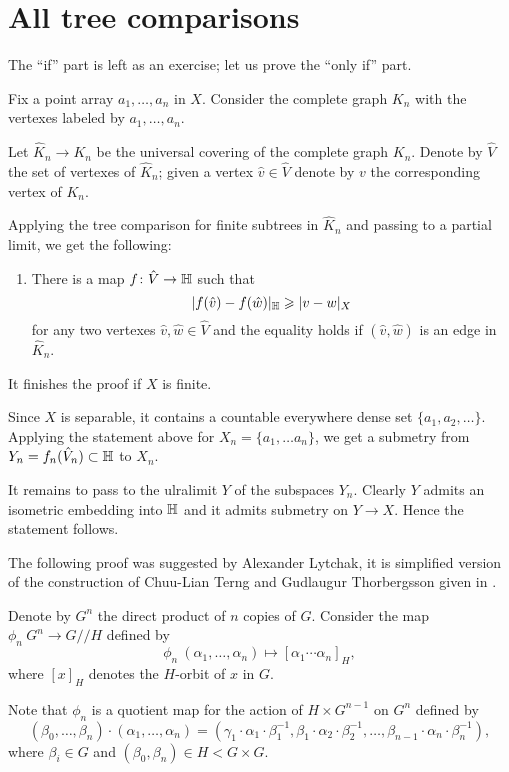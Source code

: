 \section{All tree comparisons}\label{sec:all-tree}


The ``if'' part is left as an exercise;
let us prove the ``only if'' part.

Fix a point array $a_1,\dots, a_n$ in $X$.
Consider the complete graph $K_n$ with the vertexes labeled by $a_1,\dots, a_n$.


Let $\hat K_n\to K_n$ be the universal covering of the complete graph $K_n$.
Denote by $\hat  V$ the set of vertexes of $\hat  K_n$;
given a vertex $\hat  v\in\hat V$ denote by $v$ the corresponding vertex of $K_n$.

Applying the tree comparison for finite subtrees in $\hat  K_n$ and passing to a partial limit,  we get the following:

\begin{enumerate}[$({*})$]
\item There is a map $f\colon\hat V\to\mathbb{H}$ such that 
\[|f(\hat v)-f(\hat w)|_{\mathbb{H}}\geqslant |v-w|_X\]
for any two vertexes $\hat v,\hat w\in \hat  V$ and the equality holds if $(\hat v,\hat w)$ is an edge in $\hat  K_n$.
\end{enumerate}

It finishes the proof if $X$ is finite.

Since $X$ is separable, it contains a countable everywhere dense set $\{a_1,a_2,\dots\}$. 
Applying the statement above for $X_n=\{a_1,\dots a_n\}$, we get 
a submetry from $Y_n=f_n(\hat V_n)\subset \mathbb{H}$ to $X_n$.

It remains to pass to the ulralimit $Y$ of the subspaces $Y_n$.
Clearly $Y$ admits an isometric embedding into $\mathbb{H}$ 
and it admits submetry on $Y\to X$.
Hence the statement follows.
\qeds


The following proof was suggested by Alexander Lytchak, it is simplified version of the construction of Chuu-Lian Terng and Gudlaugur Thorbergsson given in \cite[Section 4]{terng-thorbergsson}.


Denote by $G^n$ the direct product of $n$ copies of $G$.
Consider the map $\phi_n\:G^n\to G/\!\!/H$ defined by
\[\phi_n\:(\alpha_1,\dots,\alpha_n)\mapsto [\alpha_1\cdots\alpha_n]_H,\]
where $[x]_H$ denotes the $H$-orbit of $x$ in $G$.

Note that $\phi_n$ is a quotient map for the action of $H\times G^{n-1}$ on $G^n$ defined by
\[(\beta_0,\dots,\beta_n)\cdot(\alpha_1,\dots,\alpha_n)=(\gamma_1\cdot \alpha_1\cdot\beta_1^{-1},\beta_1\cdot\alpha_2\cdot\beta_2^{-1},\dots,\beta_{n-1}\cdot\alpha_n\cdot\beta_n^{-1}),\]
where $\beta_i\in G$ and $(\beta_0,\beta_n)\in H<G\times G$. 

